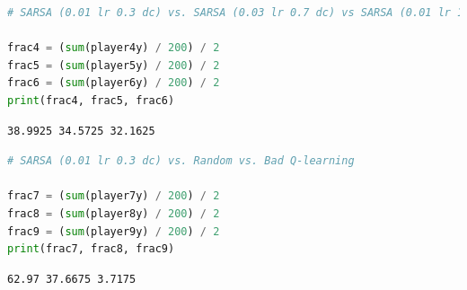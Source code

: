 \begin{lstlisting}[language=Python]
# SARSA (0.01 lr 0.3 dc) vs. SARSA (0.03 lr 0.7 dc) vs SARSA (0.01 lr 1 dc)

frac4 = (sum(player4y) / 200) / 2
frac5 = (sum(player5y) / 200) / 2
frac6 = (sum(player6y) / 200) / 2
print(frac4, frac5, frac6)
\end{lstlisting}

\begin{lstlisting}
38.9925 34.5725 32.1625
\end{lstlisting}

\begin{lstlisting}[language=Python]
# SARSA (0.01 lr 0.3 dc) vs. Random vs. Bad Q-learning

frac7 = (sum(player7y) / 200) / 2
frac8 = (sum(player8y) / 200) / 2
frac9 = (sum(player9y) / 200) / 2
print(frac7, frac8, frac9)
\end{lstlisting}

\begin{lstlisting}
62.97 37.6675 3.7175
\end{lstlisting}
